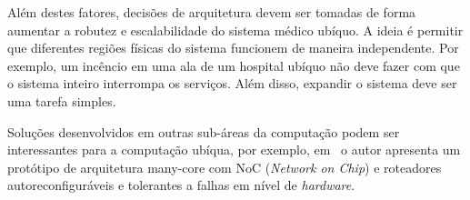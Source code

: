 Além destes fatores, decisões de arquitetura devem ser tomadas de forma aumentar a robutez e escalabilidade do sistema médico ubíquo. A ideia é permitir que diferentes regiões físicas do sistema funcionem de maneira independente. Por exemplo, um incêncio em uma ala de um hospital ubíquo não deve fazer com que o sistema inteiro interrompa os serviços. Além disso, expandir o sistema deve ser uma tarefa simples.


% 
% 
% 
% 
% 

Soluções desenvolvidos em outras sub-áreas da computação podem ser interessantes para a computação ubíqua, por exemplo, em~\cite{parikhformally} o autor apresenta um protótipo de arquitetura many-core com NoC (\emph{Network on Chip}) e roteadores autoreconfiguráveis e tolerantes a falhas em nível de \emph{hardware}.
